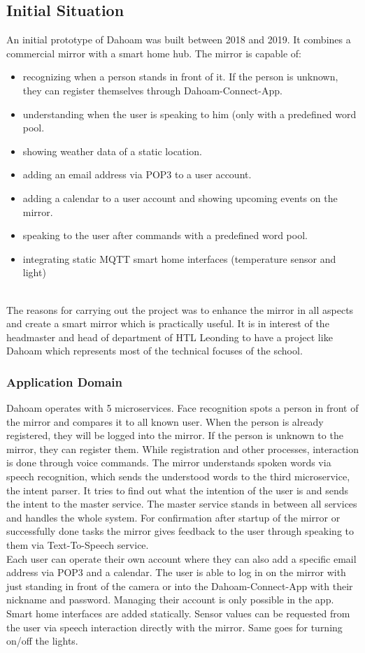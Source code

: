 \documentclass[12pt]{article}
\theoremstyle{definition}
\begin{document}
\subsection{Initial Situation}
An initial prototype of Dahoam was built between 2018 and 2019. It combines a commercial mirror with a smart home hub.
The mirror is capable of:
\begin{itemize}
    \item recognizing when a person stands in front of it. If the person is unknown, they can register themselves through Dahoam-Connect-App.
    \item understanding when the user is speaking to him (only with a predefined word pool.
    \item showing weather data of a static location.
    \item adding an email address via POP3 to a user account.
    \item adding a calendar to a user account and showing upcoming events on the mirror.
    \item speaking to the user after commands with a predefined word pool.
    \item integrating static MQTT smart home interfaces (temperature sensor and light)
\end{itemize}
\\
The reasons for carrying out the project was to enhance the mirror in all aspects and create a smart mirror which is practically useful. It is in interest of the headmaster and head of department of HTL Leonding to have a project like Dahoam which represents most of the technical focuses of the school.

\subsubsection{Application Domain}
Dahoam operates with 5 microservices. Face recognition spots a person in front of the mirror and compares it to all known user. When the person is already registered, they will be logged into the mirror. If the person is unknown to the mirror, they can register them. While registration and other processes, interaction is done through voice commands. The mirror understands spoken words via speech recognition, which sends the understood words to the third microservice, the intent parser. It tries to find out what the intention of the user is and sends the intent to the master service. The master service stands in between all services and handles the whole system. 
For confirmation after startup of the mirror or successfully done tasks the mirror gives feedback to the user through speaking to them via Text-To-Speech service.\\
Each user can operate their own account where they can also add a specific email address via POP3 and a calendar. The user is able to log in on the mirror with just standing in front of the camera or into the Dahoam-Connect-App with their nickname and password. Managing their account is only possible in the app.
\\
Smart home interfaces are added statically. Sensor values can be requested from the user via speech interaction directly with the mirror. Same goes for turning on/off the lights.
\end{document}
